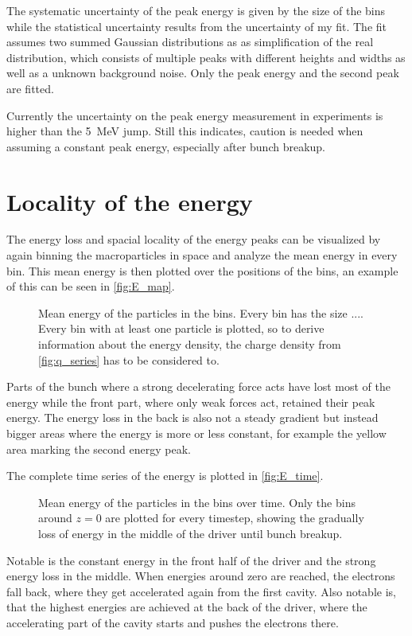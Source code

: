 \documentclass[bachelor_thesis]{subfiles}
\begin{document}
The systematic uncertainty of the peak energy is given by the size of the bins while the statistical uncertainty results from the uncertainty of my fit.  The fit assumes two summed Gaussian distributions as as
simplification of the real distribution, which consists of multiple peaks with different heights and widths as well as a unknown background noise. Only the peak energy and the second peak are fitted.

Currently the uncertainty on the peak energy measurement in experiments is higher than the \qty{5}{\MeV} jump. Still this indicates, caution is needed when assuming a constant peak energy, especially after bunch breakup.

\section{Locality of the energy}\label{chap:loc_E}
The energy loss and spacial locality of the energy peaks can be visualized by again binning the macroparticles in space and analyze the mean energy in every bin. This mean energy is then plotted over the positions of the bins,
an example of this can be seen in \autoref{fig:E_map}. 
\begin{figure}
	\centering
	\missingfigure{}
	\caption{Mean energy of the particles in the bins. Every bin has the size .... Every bin with at least one particle is plotted, so to derive information about the energy density, the charge density from \autoref{fig:q_series} has to be considered to.}
	\label{fig:E_map}
\end{figure}

Parts of the bunch where a strong decelerating force acts have lost most of the energy while the front part, where only weak forces act, retained their peak energy. The energy loss in the back is also not a steady gradient but instead bigger areas where the energy is more or less constant, 
for example the yellow area marking the second energy peak.

The complete time series of the energy is plotted in \autoref{fig:E_time}.
\begin{figure}
	\centering
	\missingfigure{}
	\caption{Mean energy of the particles in the bins over time. Only the bins around $z=0$ are plotted for every timestep, showing the gradually loss of energy in the middle of the driver until bunch breakup.}
	\label{fig:E_time}
\end{figure}
Notable is the constant energy in the front half of the driver and the strong energy loss in the middle. When energies around zero are reached, the electrons fall back, where they get accelerated again from the first cavity.
Also notable is, that the highest energies are achieved at the back of the driver, where the accelerating part of the cavity starts and pushes the electrons there.
\end{document}
